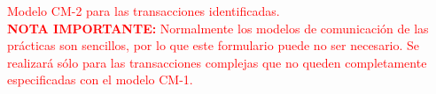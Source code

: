 \documentclass[12pt,a4paper,twoside,spanish]{article}      %
\begin{document}
\textcolor {red} {
Modelo CM-2 para las transacciones identificadas.
\\
\textbf{NOTA IMPORTANTE:} Normalmente los modelos de comunicación de las prácticas son sencillos, por lo que este formulario puede no ser necesario. Se realizará sólo
para las transacciones complejas que no queden completamente
especificadas con el modelo CM-1.
}

\end{document}
